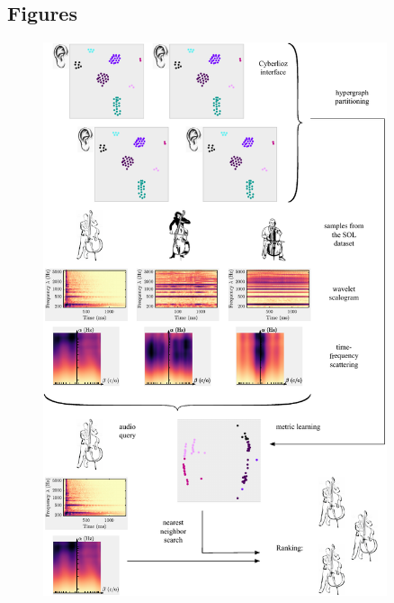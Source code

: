 \documentclass{bmcart}
\begin{document}
\begin{backmatter}

\section*{Figures}

\begin{figure}[h!]
\includegraphics[width=0.9\textwidth]{figures/lostanlen2020jasmp_fig1_v3.pdf}
\caption{}
\label{fig:pipeline}
\end{figure}


\end{backmatter}
\end{document}
